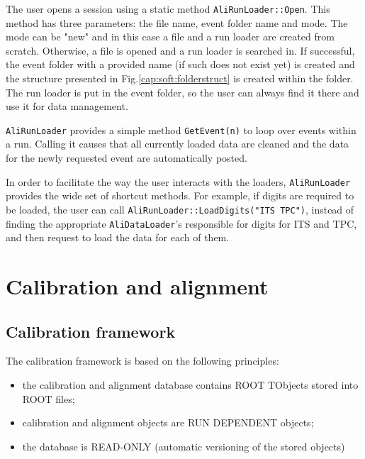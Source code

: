 \documentclass[12pt,a4paper,twoside]{article}
\begin{document}
{\begin{enumerate}
  The user opens a session using a static method \texttt{AliRunLoader::Open}.
  This method has three parameters: the file name, event folder name and mode.
  The mode can be "new" and in this case a file and a run loader are created from scratch. 
  Otherwise, a file is opened and a run loader is searched in.
  If successful, the event folder with a provided name 
  (if such does not exist yet) is created and the structure 
  presented in Fig.\ref{cap:soft:folderstruct} is created within the folder. 
  The run loader is 
  put in the event folder, so the user can always find it there
  and use it for data management.

  \texttt{AliRunLoader} provides a simple method \texttt{GetEvent(n)} 
  to loop over events within a run. Calling it causes that all 
  currently loaded data are cleaned and the data for 
  the newly requested event are automatically posted.
  
  In order to facilitate the way the user interacts with the loaders,
  \texttt{AliRunLoader} provides the wide set of shortcut methods. 
  For example, if digits are required to be loaded, the user can call
  \texttt{AliRunLoader::LoadDigits("ITS TPC")}, instead of finding the appropriate
  \texttt{AliDataLoader}'s responsible for digits for ITS and TPC, 
  and then request to load the data for each of them.
  

\end{enumerate}

\newpage
\section{Calibration and alignment}


\subsection{Calibration framework}


The calibration framework is based on the following principles:

\begin{itemize}

\item the calibration and alignment database contains ROOT TObjects stored 
  into ROOT files;

\item calibration and alignment objects are RUN DEPENDENT objects;

\item the database is READ-ONLY (automatic versioning of the stored 
  objects)


\end{itemize}}
\end{document}
